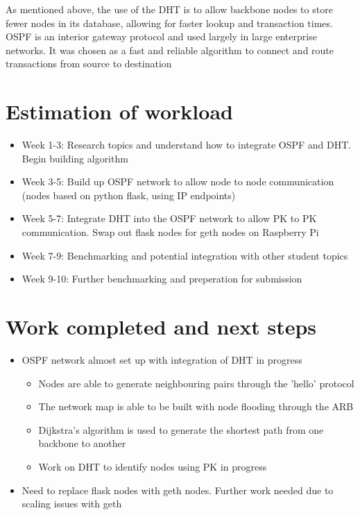 As mentioned above, the use of the DHT is to allow backbone nodes to store fewer nodes in its database, allowing for faster lookup and transaction times. OSPF is an interior gateway protocol and used largely in large enterprise networks. \cite{ospf} It was chosen as a fast and reliable algorithm to connect and route transactions from source to destination

\newpage

\section{Estimation of workload}

\begin{itemize}
  \item Week 1-3: Research topics and understand how to integrate OSPF and DHT. Begin building algorithm
  \item Week 3-5: Build up OSPF network to allow node to node communication (nodes based on python flask, using IP endpoints)
  \item Week 5-7: Integrate DHT into the OSPF network to allow PK to PK communication. Swap out flask nodes for geth nodes on Raspberry Pi
  \item Week 7-9: Benchmarking and potential integration with other student topics
  \item Week 9-10: Further benchmarking and preperation for submission
\end{itemize}


\section{Work completed and next steps}

\begin{itemize}
  \item OSPF network almost set up with integration of DHT in progress
     \begin{itemize}
        \item Nodes are able to generate neighbouring pairs through the 'hello' protocol
        \item The network map is able to be built with node flooding through the ARB
        \item Dijkstra's algorithm is used to generate the shortest path from one backbone to another
        \item Work on DHT to identify nodes using PK in progress
     \end{itemize}
  \item Need to replace flask nodes with geth nodes. Further work needed due to scaling issues with geth
\end{itemize}
